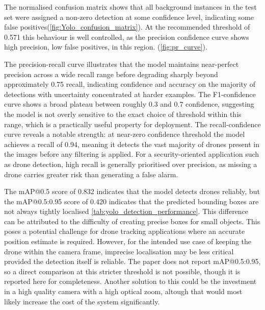 \vspace{1em}

The normalised confusion matrix shows that all background instances in the test set were assigned a non-zero detection at some confidence level, indicating some false positives(\ref{fig:Yolo_confusion_matrix}). At the recommended threshold of 0.571 this behaviour is well controlled, as the precision confidence curve shows high precision, low false positives, in this region. (\ref{fig:pr_curve}). 

The precision-recall curve illustrates that the model maintains near-perfect precision across a wide recall range before degrading sharply beyond approximately 0.75 recall, indicating confidence and accuracy on the majority of detections with uncertainty concentrated at harder examples. The F1-confidence curve shows a broad plateau between roughly 0.3 and 0.7 confidence, suggesting the model is not overly sensitive to the exact choice of threshold within this range, which is a practically useful property for deployment. The recall-confidence curve reveals a notable strength: at near-zero confidence threshold the model achieves a recall of 0.94, meaning it detects the vast majority of drones present in the images before any filtering is applied. For a security-oriented application such as drone detection, high recall is generally prioritised over precision, as missing a drone carries greater risk than generating a false alarm.

\vspace{1em}

The mAP@0.5 score of 0.832 indicates that the model detects drones reliably, but the mAP@0.5:0.95 score of 0.420 indicates that the predicted bounding boxes are not always tightly localised \ref{tab:yolo_detection_performance}. This difference can be attributed to the difficulty of creating precise boxes for small objects. This poses a potential challenge for drone tracking applications where an accurate position estimate is required. However, for the intended use case of keeping the drone within the camera frame, imprecise localisation may be less critical provided the detection itself is reliable. The paper does not report mAP@0.5:0.95, so a direct comparison at this stricter threshold is not possible, though it is reported here for completeness. Another solution to this could be the investment in a high quality camera with a high optical zoom, altough that would most likely increase the cost of the system significantly. 

\vspace{1em}

